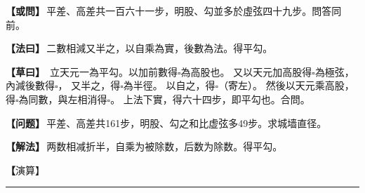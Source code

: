 \documentclass[11pt,a4paper]{article}
\let\origsquare\square
\renewcommand{\square}{\ensuremath{\origsquare}}%
\newcommand{\longline}{\noindent\rule{\textwidth}{0.4pt}}
\newcommand{\clOWEN}[1]{%
  \par\vspace{0.3em}%
  \noindent\textcolor{problemcolor}{\textbf{【或問】}}\,{\tradfont #1}\par\nopagebreak%
}
\newcommand{\mdOWEN}[1]{%
  \par\vspace{0.3em}%
  \noindent\textcolor{problemcolor}{\textbf{【问题】}}\,{\modfont #1}\par\nopagebreak%
}
\newcommand{\clFAYUE}[1]{%
  \par\noindent\textcolor{methodcolor}{\textbf{【法曰】}}\,{\tradfont #1}\par\nopagebreak%
}
\newcommand{\mdFAYUE}[1]{%
  \par\noindent\textcolor{methodcolor}{\textbf{【解法】}}\,{\modfont #1}\par\nopagebreak%
}
\newcommand{\clTSAOYUE}[1]{%
  \par\noindent\textcolor{workcolor}{\textbf{【草曰】}}\,{\tradfont #1}\par%
}
\newcommand{\mdTSAOYUE}[1]{%
  \par\noindent\textcolor{workcolor}{\textbf【演算】}}\,{\modfont #1}\par%
\begin{document}
\begin{paracol}{2}

\begin{leftcolumn}
\clOWEN{平差、高差共一百六十一步，明股、勾並多於虛弦四十九步。問答同前。}

\clFAYUE{二數相減又半之，以自乘為實，後數為法。得平勾。}

\clTSAOYUE{%
立天元一為平勾。以加前數得$\square$為高股也。
又以天元加高股得$\square$為極弦，內減後數得$\square$，
又半之，得$\square$為半徑。
以自之，得$\square$（寄左）。
然後以天元乘高股，得$\square$為同數，與左相消得$\square$。
上法下實，得六十四步，即平勾也。合問。}
\end{leftcolumn}

\switchcolumn

\begin{rightcolumn}
\mdOWEN{平差、高差共161步，明股、勾之和比虚弦多49步。求城墙直径。}

\mdFAYUE{两数相减折半，自乘为被除数，后数为除数。得平勾。}

\mdTSAOYUE{%
设天元一为平勾。加上前数得$\square$为高股。
又以天元加高股得$\square$为极弦，减去后数得$\square$，
折半得$\square$为半径。
自乘得$\square$（寄左）。
然后以天元乘高股得$\square$为同数，与左式相消得$\square$。
上法下实，得64步，即平勾。符合所问。}
\end{rightcolumn}

\end{paracol}

\vspace{0.3cm}
\begin{center}\longline\end{center}
\end{document}

